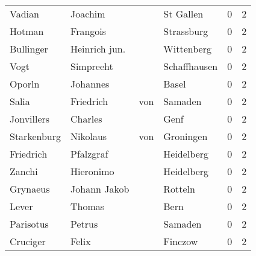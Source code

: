 \documentclass[10pt,a4paper,landscape]{article}
\begin{document}
\begin{longtable}{llllrr}
                   Vadian &                            Joachim &             &                                   St Gallen &          0 &         2 \\
                   Hotman &                           Frangois &             &                                  Strassburg &          0 &         2 \\
                Bullinger &                      Heinrich jun. &             &                                  Wittenberg &          0 &         2 \\
                     Vogt &                          Simpreeht &             &                                Schaffhausen &          0 &         2 \\
                   Oporln &                           Johannes &             &                                       Basel &          0 &         2 \\
                    Salia &                          Friedrich &         von &                                     Samaden &          0 &         2 \\
               Jonvillers &                            Charles &             &                                        Genf &          0 &         2 \\
              Starkenburg &                           Nikolaus &         von &                                   Groningen &          0 &         2 \\
                Friedrich &                          Pfalzgraf &             &                                  Heidelberg &          0 &         2 \\
                   Zanchi &                          Hieronimo &             &                                  Heidelberg &          0 &         2 \\
                 Grynaeus &                       Johann Jakob &             &                                     Rotteln &          0 &         2 \\
                    Lever &                             Thomas &             &                                        Bern &          0 &         2 \\
                Parisotus &                             Petrus &             &                                     Samaden &          0 &         2 \\
                 Cruciger &                              Felix &             &                                     Finczow &          0 &         2 \\

\end{longtable}
\end{document}
